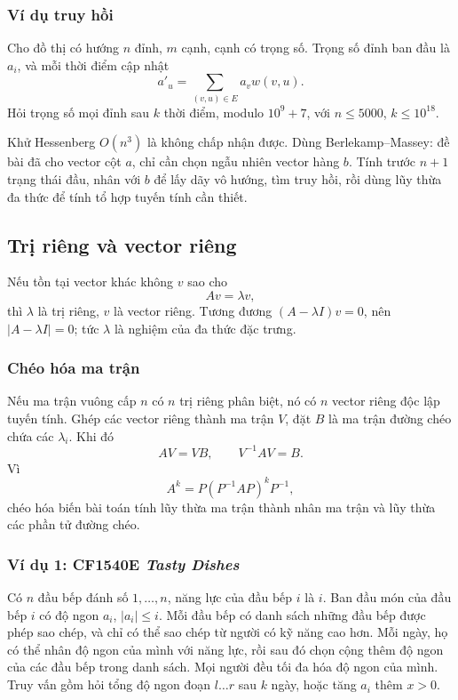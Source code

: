 \documentclass[11pt]{article}
\begin{document}
\subsubsection{Ví dụ truy hồi}

Cho đồ thị có hướng \(n\) đỉnh, \(m\) cạnh, cạnh có trọng số. Trọng số đỉnh
ban đầu là \(a_i\), và mỗi thời điểm cập nhật
\[
  a'_u=\sum_{(v,u)\in E} a_v w(v,u).
\]
Hỏi trọng số mọi đỉnh sau \(k\) thời điểm, modulo \(10^9+7\), với
\(n\le 5000\), \(k\le 10^{18}\).

Khử Hessenberg \(O(n^3)\) là không chấp nhận được. Dùng Berlekamp--Massey: đề
bài đã cho vector cột \(a\), chỉ cần chọn ngẫu nhiên vector hàng \(b\). Tính
trước \(n+1\) trạng thái đầu, nhân với \(b\) để lấy dãy vô hướng, tìm truy hồi,
rồi dùng lũy thừa đa thức để tính tổ hợp tuyến tính cần thiết.

\subsection{Trị riêng và vector riêng}

Nếu tồn tại vector khác không \(v\) sao cho
\[
  Av=\lambda v,
\]
thì \(\lambda\) là trị riêng, \(v\) là vector riêng. Tương đương
\((A-\lambda I)v=0\), nên \(|A-\lambda I|=0\); tức \(\lambda\) là nghiệm của
đa thức đặc trưng.

\subsubsection{Chéo hóa ma trận}

Nếu ma trận vuông cấp \(n\) có \(n\) trị riêng phân biệt, nó có \(n\) vector
riêng độc lập tuyến tính. Ghép các vector riêng thành ma trận \(V\), đặt
\(B\) là ma trận đường chéo chứa các \(\lambda_i\). Khi đó
\[
  AV=VB,\qquad V^{-1}AV=B.
\]
Vì
\[
  A^k=P(P^{-1}AP)^kP^{-1},
\]
chéo hóa biến bài toán tính lũy thừa ma trận thành nhân ma trận và lũy thừa
các phần tử đường chéo.

\subsubsection{Ví dụ 1: CF1540E \emph{Tasty Dishes}}

Có \(n\) đầu bếp đánh số \(1,\ldots,n\), năng lực của đầu bếp \(i\) là \(i\).
Ban đầu món của đầu bếp \(i\) có độ ngon \(a_i\), \(|a_i|\le i\). Mỗi đầu bếp
có danh sách những đầu bếp được phép sao chép, và chỉ có thể sao chép từ người
có kỹ năng cao hơn. Mỗi ngày, họ có thể nhân độ ngon của mình với năng lực, rồi
sau đó chọn cộng thêm độ ngon của các đầu bếp trong danh sách. Mọi người đều
tối đa hóa độ ngon của mình. Truy vấn gồm hỏi tổng độ ngon đoạn \(l\ldots r\)
sau \(k\) ngày, hoặc tăng \(a_i\) thêm \(x>0\).
\end{document}

